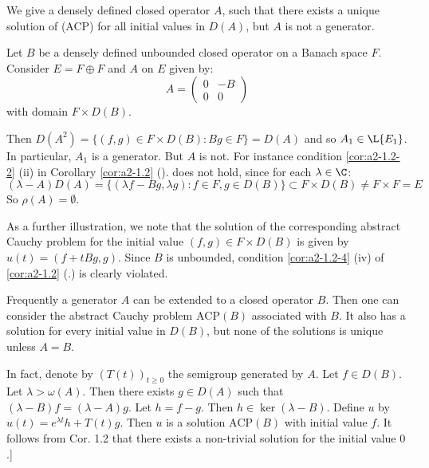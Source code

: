 \begin{example}\label{ex:a2-1.4}
We give a densely defined closed operator $ A $, such that there exists a unique solution of (ACP) for all initial values in $ D(A) $, but $ A $ is not a generator.

Let $ B $ be a densely defined unbounded closed operator on a Banach space $ F $.
Consider $ E = F \oplus F $ and $ A $ on $ E $ given by:
\[
    A = \begin{pmatrix} 0 & -B \\ 0 & 0 \end{pmatrix}
\]
with domain $ F \times D(B) $.

Then $ D(A^{2}) = \{(f,g) \in F \times D(B) \colon Bg \in F\} = D(A) $ and so $ A_{1} \in \L{E_{1}} $.
In particular, $ A_{1} $ is a generator.
But $ A $ is not. For instance
condition \ref{cor:a2-1.2-2} (\lnm ii) in Corollary \ref{cor:a2-1.2} (). does not hold, since for each $ \lambda \in \C $:
\[
    (\lambda-A)D(A) = \{(\lambda f-Bg,\lambda g) \colon f \in F, g \in D(B)\} \subset F \times D(B) \neq F \times F = E
\]
So $ \rho(A) = \emptyset $.

As a further illustration, we note that the solution of the corresponding abstract Cauchy problem for the initial value $ (f,g) \in F \times D(B) $ is given by $ u(t) = (f + tBg,g) $.
Since $ B $ is unbounded, condition \ref{cor:a2-1.2-4} (\lnm iv) of \ref{cor:a2-1.2} (.) is clearly violated.
\end{example}
\begin{remark*}\label{rem:a2-1.4-kgk} 
Frequently a generator $A$ can be extended to a closed operator $B$.
Then one can consider the abstract Cauchy problem $\text{ACP}(B)$ associated with $B$.
It also has a solution for every initial value in $D(B)$, but none of the solutions is unique unless $A = B$.

In fact, denote by $(T(t))_{t \geq 0}$ the semigroup generated by $A$.
Let $f \in D(B)$.
Let $\lambda > \omega(A)$.
Then there exists $g \in D(A)$ such that $(\lambda-B)f = (\lambda-A)g$.
Let $h = f - g$.
Then $h \in \ker(\lambda-B)$.
Define $u$ by $u(t) = e^{\lambda t}h + T(t)g$.
Then $u$ is a solution $\text{ACP}(B)$ with initial value $f$.
It follows from Cor. 1.2 that there exists a non-trivial solution for the initial value $0$.]
\end{remark*}
